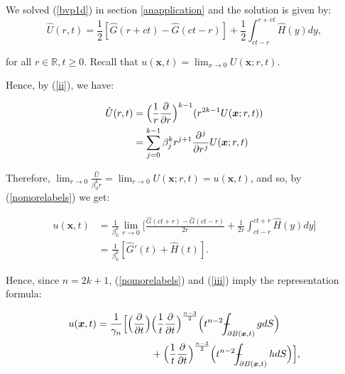 \documentclass[a4paper, 12pt]{article}
\def\Xint#1{\mathchoice
{\XXint\displaystyle\textstyle{#1}}%
{\XXint\textstyle\scriptstyle{#1}}%
{\XXint\scriptstyle\scriptscriptstyle{#1}}%
{\XXint\scriptscriptstyle\scriptscriptstyle{#1}}%
\!\int}
\def\XXint#1#2#3{{\setbox0=\hbox{$#1{#2#3}{\int}$ }
\vcenter{\hbox{$#2#3$ }}\kern-.6\wd0}}
\def\dashint{\Xint-}
\numberwithin{equation}{section}
\begin{document}
We solved (\ref{bvp1d}) in section \ref{anapplication} and the solution is given by: 
\begin{equation}\label{nomorelabels}
    \hat{U}(r,t)=\frac{1}{2}[\hat{G}(r+ct)-\hat{G}(ct-r)]+\frac{1}{2}\int_{ct-r}^{r+ct}\hat{H}(y)dy,
\end{equation}

for all $r\in\mathbb{R}, t \ge 0$. Recall that $u(\boldsymbol{x},t)=\lim_{x \rightarrow 0} U(\boldsymbol{x}; r, t)$.

Hence, by (\ref{ii}), we have:

\begin{equation*}
    \begin{aligned}
        \hat{U}(r,t)&=\Big(\frac{1}{r} \diffp[1]{}{r}\Big)^{k-1}(r^{2k-1}U(\boldsymbol{x};r,t))\\
        &=\sum_{j=0}^{k-1}\beta_j^k r^{j+1} \diffp[j]{}{r}U(\boldsymbol{x};r,t)
    \end{aligned}
\end{equation*}

Therefore, $\lim_{r \rightarrow 0} \frac{\hat{U}}{\beta_0^k r}=\lim_{r \rightarrow 0} U(\boldsymbol{x}; r, t)=u(\boldsymbol{x}, t)$, and so, by (\ref{nomorelabels}) we get:

\begin{equation*}
    \begin{aligned}
        u(\boldsymbol{x}, t)&=\frac{1}{\beta_0^k} \lim_{r \rightarrow 0}\Big[\frac{\hat{G}(ct+r)-\hat{G}(ct-r)}{2r} + \frac{1}{2r}\int_{ct-r}^{ct+r} \hat{H}(y)dy\Big]\\
        &= \frac{1}{\beta_0^k}[\hat{G}'(t)+\hat{H}(t)].
    \end{aligned}
\end{equation*}

Hence, since $n=2k+1$, (\ref{nomorelabels}) and (\ref{iii}) imply the representation formula:

\begin{equation} \label{solnodd}
    \begin{split}
        u(\boldsymbol{x}, t)=\frac{1}{\gamma_n}\Big[\Big(\diffp[1]{}{t}\Big) & \Big(\frac{1}{t} \diffp[1]{}{t} \Big)^{\frac{n-3}{2}}\Big(t^{n-2} \dashint_{\partial B(\boldsymbol{x},t)}gdS \Big)\\
        &+ \Big(\frac{1}{t} \diffp[1]{}{t} \Big)^{\frac{n-3}{2}}\Big(t^{n-2} \dashint_{\partial B(\boldsymbol{x},t)}hdS \Big)\Big],
    \end{split}
\end{equation} 
\end{document}
